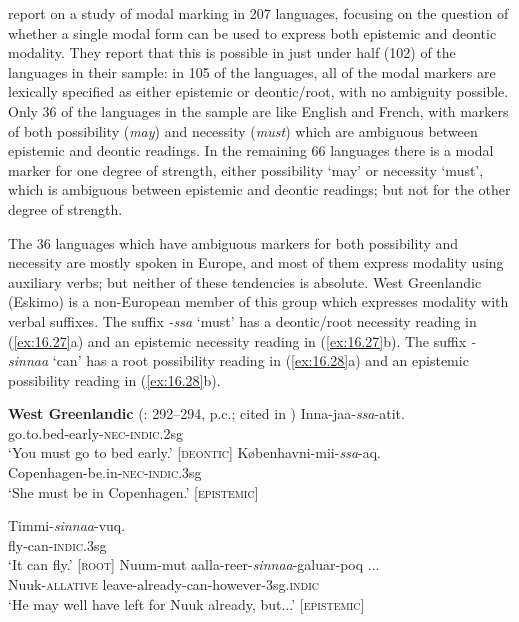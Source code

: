  report on a study of modal marking in 207 languages, focusing on the question of whether a single modal form can be used to express both epistemic and deontic modality. They report that this is possible in just under half (102) of the languages in their sample: in 105 of the languages, all of the modal markers are lexically specified as either epistemic or deontic/root, with no ambiguity possible. Only 36 of the languages in the sample are like English and French, with markers of both possibility (\textit{may}) and necessity (\textit{must}) which are ambiguous between epistemic and deontic readings. In the remaining 66 languages there is a modal marker for one degree of strength, either possibility ‘may’ or necessity ‘must’, which is ambiguous between epistemic and deontic readings; but not for the other degree of strength.


The 36 languages which have ambiguous markers for both possibility and necessity are mostly spoken in Europe, and most of them express modality using auxiliary verbs; but neither of these tendencies is absolute. West Greenlandic (Eskimo) is a non-European member of this group which expresses modality with verbal suffixes. The suffix \textit{-ssa} ‘must’ has a deontic/root necessity reading in (\ref{ex:16.27}a) and an epistemic necessity reading in (\ref{ex:16.27}b). The suffix \textit{-sinnaa} ‘can’ has a root possibility reading in (\ref{ex:16.28}a) and an epistemic possibility reading in (\ref{ex:16.28}b).


\noindent \textbf{West Greenlandic} (\citealt{Fortescue1984}: 292–294, p.c.; cited in \citealt{vanderAuweraAmmann2013}) 
\ea \label{ex:16.27}
\ea  \gll Inna-jaa-\textit{ssa}-atit.\\
go.to.bed-early-\textsc{nec-indic}.2sg\\
\glt ‘You must go to bed early.’  [\textsc{deontic}]
\ex \gll Københavni-mii-\textit{ssa}-aq.\\
Copenhagen-be.in-\textsc{nec-indic}.3sg\\
\glt ‘She must be in Copenhagen.’  [\textsc{epistemic}]
\z \z

\ea \label{ex:16.28} \gll Timmi-\textit{sinnaa}-vuq.\\
fly-can-\textsc{indic}.3sg\\
\glt ‘It can fly.’  [\textsc{root}]
\ex \gll  Nuum-mut  aalla-reer-\textit{sinnaa}-galuar-poq ...\\
Nuuk-\textsc{allative}  leave-already-can-however-3sg.\textsc{indic}\\
\glt ‘He may well have left for Nuuk already, but...’  [\textsc{epistemic}]
\z


